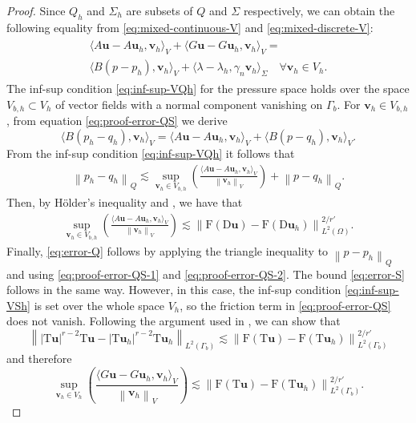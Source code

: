 \documentclass[onefignum,onetabnum]{siamart190516}
\newcommand{\bu}{\boldsymbol{u}}
\newcommand{\bv}{\boldsymbol{v}}
\newcommand{\bT}{\boldsymbol{\mathrm{T}}}
\newcommand{\bD}{\boldsymbol{\mathrm{D}}}
\newcommand{\bF}{\boldsymbol{\mathrm{F}}}
\newcommand{\nrm}[1]{\left\lVert#1\right\rVert}
\begin{document}
	\begin{proof}
		Since $Q_h$ and $\Sigma_h$ are subsets of $Q$ and $\Sigma$ respectively, we can obtain the following equality from \eqref{eq:mixed-continuous-V} and \eqref{eq:mixed-discrete-V}:
		\begin{align}\label{eq:proof-error-QS}
			\begin{split}
				\langle A\bu - A\bu_h, \bv_h \rangle_V + \langle G\bu - G\bu_h, \bv_h \rangle_V = \\
				\langle B(p - p_h), \bv_h \rangle_V + \langle \lambda - \lambda_h, \gamma_n \bv_h \rangle_\Sigma \quad \forall \bv_h\in V_h.		
			\end{split}
		\end{align}
		The inf-sup condition \eqref{eq:inf-sup-VQh} for the pressure space holds over the space $V_{b,h}\subset V_h$ of vector fields with a normal component vanishing on $\Gamma_b$. For $\bv_h\in V_{b,h}$, from equation \eqref{eq:proof-error-QS} we derive
		\[
			\langle B(p_h - q_h), \bv_h \rangle_V  = \langle A\bu - A\bu_h, \bv_h \rangle_V + \langle B(p - q_h), \bv_h \rangle_V.
		\]
		From the inf-sup condition \eqref{eq:inf-sup-VQh} it follows that
		\begin{align}\label{eq:proof-error-QS-1}
			\nrm{p_h - q_h}_Q \lesssim \sup_{\bv_h\in V_{b,h}}{\left( \frac{\langle A\bu - A\bu_h, \bv_h \rangle_V}{\nrm{\bv_h}_V} \right)} + \nrm{p - q_h}_Q.
		\end{align}
		Then, by H\"older's inequality and \cite[Lemma 2.4]{hirn2013}, we have that 
		\begin{align}\label{eq:proof-error-QS-2}
			\sup_{\bv_h\in V_{b,h}}{\left( \frac{\langle A\bu - A\bu_h, \bv_h \rangle_V}{\nrm{\bv_h}_V} \right)} \lesssim \nrm{\bF(\bD\bu) - \bF(\bD\bu_h)}_{L^2(\Omega)}^{2/r'}.
		\end{align}
		Finally, \eqref{eq:error-Q} follows by applying the triangle inequality to $\nrm{p - p_h}_Q$ and using \eqref{eq:proof-error-QS-1} and \eqref{eq:proof-error-QS-2}. The bound \eqref{eq:error-S} follows in the same way. However, in this case, the inf-sup condition \eqref{eq:inf-sup-VSh} is set over the whole space $V_h$, so the friction term in \eqref{eq:proof-error-QS} does not vanish. Following the argument used in \cite[Lemma 2.4]{hirn2013}, we can show that  
		\[
			\nrm{|\bT\bu|^{r-2}\bT\bu - |\bT\bu_h|^{r-2}\bT\bu_h}_{L^2(\Gamma_b)} \lesssim \nrm{\bF(\bT\bu) - \bF(\bT\bu_h)}^{2/r'}_{L^2(\Gamma_b)}
		\]
		and therefore
		\[
			\sup_{\bv_h\in V_h}{\left( \frac{\langle G\bu - G\bu_h, \bv_h \rangle_V}{\nrm{\bv_h}_V} \right)} \lesssim \nrm{\bF(\bT\bu) - \bF(\bT\bu_h)}^{2/r'}_{L^2(\Gamma_b)}.
		\]
		\end{proof}
\end{document}
